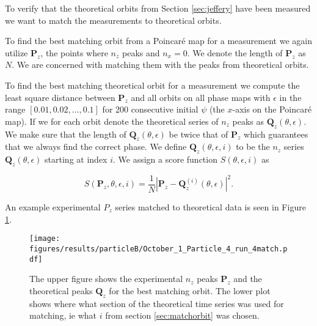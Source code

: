 \label{sec:matchorbit}
To verify that the theoretical orbits from Section \ref{sec:jeffery} have been measured we want to match the measurements to theoretical orbits.

To find the best matching orbit from a Poincaré map for a measurement we again utilize $\mathbf{P}_z$, the points where $n_z$ peaks and $n_x=0$. We denote the length of $\mathbf{P}_z$ as $N$. We are concerned with matching them with the peaks from theoretical orbits.


To find the best matching theoretical orbit for a measurement we compute the least square distance between $\mathbf{P}_z$ and all orbits on all phase maps 
with $\epsilon$ in the range $\left[0.01, 0.02, ..., 0.1\right]$ for 200 consecutive initial $\psi$ (the $x$-axis on the Poincaré map). If we for each orbit denote 
the theoretical series of $n_z$ peaks as $\mathbf{Q}_z(\theta, \epsilon)$. We make sure that the length of $\mathbf{Q}_z(\theta, \epsilon)$ be twice that 
of $\mathbf{P}_z$ which guarantees that we always find the correct phase. We define $\mathbf{Q}_z(\theta, \epsilon, i)$ to be the $n_z$ series 
$\mathbf{Q}_z(\theta, \epsilon)$ starting at index $i$. We assign a score function $S(\theta, \epsilon, i)$ as

\begin{equation}
S(\mathbf{P}_z, \theta, \epsilon, i) = \frac{1}{N}\left| \mathbf{P}_z - \mathbf{Q}_z^{(i)}(\theta, \epsilon) \right|^2.
\end{equation}

\noindent An example experimental $P_z$ series matched to theoretical data is seen in Figure \ref{fig:particleB2match}.

\begin{figure}[H]
\centering
\texttt{[image: figures/results/particleB/October\_1\_Particle\_4\_run\_4match.pdf]}
\caption{The upper figure shows the experimental $n_z$ peaks $\mathbf{P}_z$ and the theoretical peaks $\mathbf{Q}_z$ for the best matching orbit. The lower plot shows where what section of the theoretical time series was used for matching, ie what $i$ from section \ref{sec:matchorbit} was chosen.}
\label{fig:particleB2match}
\end{figure}



